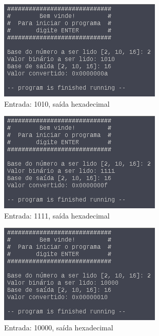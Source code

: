 \documentclass{article}
\begin{document}
\begin{figure}[H]
  \includegraphics[width=\linewidth]{./CasoBin3}
  \caption{Entrada: 1010, saída hexadecimal}
  \label{fig:bin3}
\end{figure}

\begin{figure}[H]
  \includegraphics[width=\linewidth]{./CasoBin4}
  \caption{Entrada: 1111, saída hexadecimal}
  \label{fig:bin4}
\end{figure}

\begin{figure}[H]
  \includegraphics[width=\linewidth]{./CasoBin5}
  \caption{Entrada: 10000, saída hexadecimal}
  \label{fig:bin5}
\end{figure}
\end{document}
